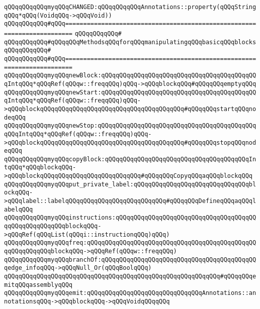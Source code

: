 \verb|qQQqqQQqqQQqmyqQQqCHANGED:qQQqqQQqqQQqAnnotations::property(qQQqStringqQQq*qQQq(VoidqQQq->qQQqVoid))|\newline
\newline
\verb|qQQqqQQqqQQq#qQQq========================================================================|\newline
\verb|qQQqqQQqqQQq#|\newline
\verb|qQQqqQQqqQQq#qQQqqQQqMethodsqQQqforqQQqmanipulatingqQQqbasicqQQqblocks|\newline
\verb|qQQqqQQqqQQq#|\newline
\verb|qQQqqQQqqQQq#qQQq========================================================================|\newline
\verb|qQQqqQQqqQQqmyqQQqnewBlock:qQQqqQQqqQQqqQQqqQQqqQQqqQQqqQQqqQQqqQQqqQQqIntqQQq*qQQqRef(qQQqw::freqqQQq)qQQq->qQQqblockqQQq#qQQqqQQqemptyqQQq|\newline
\verb|qQQqqQQqqQQqmyqQQqnewStart:qQQqqQQqqQQqqQQqqQQqqQQqqQQqqQQqqQQqqQQqqQQqIntqQQq*qQQqRef(qQQqw::freqqQQq)qQQq->qQQqblockqQQqqQQqqQQqqQQqqQQqqQQqqQQqqQQqqQQqqQQq#qQQqqQQqstartqQQqnodeqQQq|\newline
\verb|qQQqqQQqqQQqmyqQQqnewStop:qQQqqQQqqQQqqQQqqQQqqQQqqQQqqQQqqQQqqQQqqQQqqQQqIntqQQq*qQQqRef(qQQqw::freqqQQq)qQQq->qQQqblockqQQqqQQqqQQqqQQqqQQqqQQqqQQqqQQqqQQqqQQq#qQQqqQQqstopqQQqnodeqQQq|\newline
\verb|qQQqqQQqqQQqmyqQQqcopyBlock:qQQqqQQqqQQqqQQqqQQqqQQqqQQqqQQqqQQqqQQqIntqQQq*qQQqblockqQQq->qQQqblockqQQqqQQqqQQqqQQqqQQqqQQqqQQq#qQQqqQQqCopyqQQqaqQQqblockqQQq|\newline
\verb|qQQqqQQqqQQqmyqQQqput_private_label:qQQqqQQqqQQqqQQqqQQqqQQqqQQqqQQqblockqQQq->qQQqlabel::labelqQQqqQQqqQQqqQQqqQQqqQQqqQQq#qQQqqQQqDefineqQQqaqQQqlabelqQQq|\newline
\verb|qQQqqQQqqQQqmyqQQqinstructions:qQQqqQQqqQQqqQQqqQQqqQQqqQQqqQQqqQQqqQQqqQQqqQQqqQQqqQQqblockqQQq->qQQqRef(qQQqList(qQQqi::instructionqQQq)qQQq)|\newline
\verb|qQQqqQQqqQQqmyqQQqfreq:qQQqqQQqqQQqqQQqqQQqqQQqqQQqqQQqqQQqqQQqqQQqqQQqqQQqqQQqqQQqblockqQQq->qQQqRef(qQQqw::freqqQQq)|\newline
\verb|qQQqqQQqqQQqmyqQQqbranchOf:qQQqqQQqqQQqqQQqqQQqqQQqqQQqqQQqqQQqqQQqqQQqedge_infoqQQq->qQQqNull_Or(qQQqBoolqQQq)|\newline
\newline
\verb|qQQqqQQqqQQqqQQqqQQqqQQqqQQqqQQqqQQqqQQqqQQqqQQqqQQqqQQqqQQq#qQQqqQQqemitqQQqassemblyqQQq|\newline
\verb|qQQqqQQqqQQqmyqQQqemit:qQQqqQQqqQQqqQQqqQQqqQQqqQQqqQQqAnnotations::annotationsqQQq->qQQqblockqQQq->qQQqVoidqQQqqQQq|\newline
